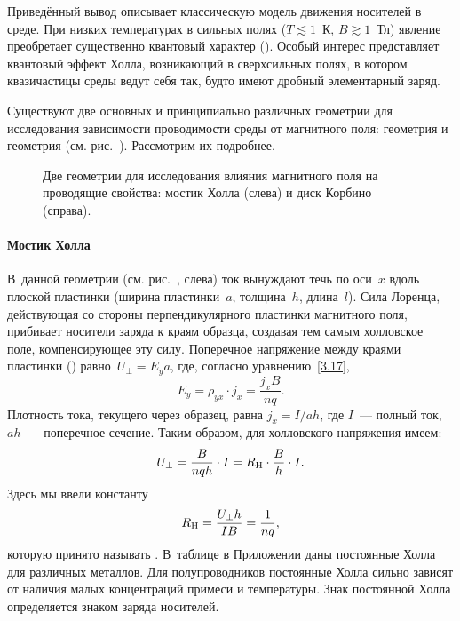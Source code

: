 \begin{lab:note}
Приведённый вывод описывает классическую модель движения носителей
в среде. При низких температурах  в сильных полях ($T\lesssim 1$~К, $B\gtrsim1$~Тл)
явление преобретает существенно квантовый характер
(). Особый интерес представляет
 квантовый эффект Холла, возникающий в сверхсильных полях,
в котором квазичастицы среды ведут себя так, будто имеют
дробный элементарный заряд.
\end{lab:note}



Существуют две основных и принципиально различных геометрии для исследования
зависимости проводимости среды от магнитного поля: геометрия  и геометрия  (см. рис.~).
Рассмотрим их подробнее.

\begin{figure}[h!]
\centering
    \caption{Две геометрии для исследования влияния магнитного поля на
проводящие свойства: мостик Холла (слева) и диск Корбино (справа).}
\end{figure}

\paragraph{Мостик Холла}
В~данной геометрии (см. рис.~, слева) ток вынуждают течь по
оси~$x$ вдоль плоской пластинки (ширина пластинки~$a$, толщина~$h$,
длина~$l$).
Сила Лоренца, действующая со стороны перпендикулярного
пластинки магнитного поля, прибивает носители заряда к краям образца,
создавая тем самым холловское поле, компенсирующее эту силу.
Поперечное напряжение между краями пластинки
() равно~$U_{\perp}=E_ya$,
где, согласно уравнению~\eqref{3.17},
\[
E_y=\rho_{yx}\cdot j_x=\frac{j_x B}{nq}.
\]
Плотность тока, текущего через образец, равна $j_x=I/ah$, где $I$~---
полный ток, $ah$~--- поперечное сечение.
Таким образом, для холловского напряжения имеем:
\begin{equation}
    U_{\perp}=\frac{B}{nqh}\cdot I =R_{\rm H}\cdot \frac{B}{h}\cdot I .
    \eqmark{3.19}
\end{equation}
Здесь мы ввели константу
\begin{equation}
    R_{\rm H}= \frac{U_{\perp}h}{IB} = \frac{1}{nq},
    \eqmark{HallConstant}
\end{equation}
которую принято называть . В~таблице в Приложении даны
постоянные Холла для различных металлов. Для полупроводников постоянные Холла
сильно зависят от наличия малых концентраций примеси и температуры.
Знак постоянной Холла определяется знаком заряда носителей.

